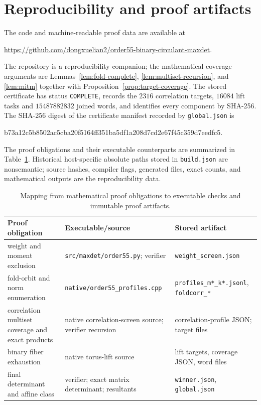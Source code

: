 \documentclass[11pt,a4paper]{article}
\theoremstyle{definition}
\theoremstyle{remark}
\begin{document}
\section{Reproducibility and proof artifacts}
\label{sec:repro}

The code and machine-readable proof data are available at
\begin{center}
\url{https://github.com/dongxuelian2/order55-binary-circulant-maxdet}.
\end{center}
The repository is a reproducibility companion; the mathematical coverage
arguments are Lemmas~\ref{lem:fold-complete}, \ref{lem:multiset-recursion},
and \ref{lem:mitm} together with Proposition~\ref{prop:target-coverage}.
The stored certificate has status \texttt{COMPLETE}, records the $2316$
correlation targets, $16084$ lift tasks and $15487882832$ joined words, and
identifies every component by SHA-256.  The SHA-256 digest of the certificate
manifest recorded by \texttt{global.json} is
\begin{center}
\small\ttfamily
b73a12c5b8502ac5cba20f5164ff351ba5df1a208d7cd2e67f45c359d7eedfc5.
\end{center}

The proof obligations and their executable counterparts are summarized in
Table~\ref{tab:proof-map}.  Historical host-specific absolute paths stored in
\texttt{build.json} are nonsemantic; source hashes, compiler flags, generated
files, exact counts, and mathematical outputs are the reproducibility data.

\begin{table}[ht]
\centering
\small
\begin{tabular}{@{}>{\raggedright\arraybackslash}p{}
                  >{\raggedright\arraybackslash}p{}
                  >{\raggedright\arraybackslash}p{}@{}}
\toprule
Proof obligation & Executable/source & Stored artifact\\
\midrule
weight and moment exclusion
& \texttt{src/maxdet/order55.py}; verifier
& \texttt{weight\_screen.json}\\
fold-orbit and norm enumeration
& \texttt{native/order55\_profiles.cpp}
& \texttt{profiles\_m*\_k*.jsonl}, \texttt{foldcorr\_*}\\
correlation multiset coverage and exact products
& native correlation-screen source; verifier recursion
& correlation-profile JSON; target files\\
binary fiber exhaustion
& native torus-lift source
& lift targets, coverage JSON, word files\\
final determinant and affine class
& verifier; exact matrix determinant; resultants
& \texttt{winner.json}, \texttt{global.json}\\
\bottomrule
\end{tabular}
\caption{Mapping from mathematical proof obligations to executable checks and
immutable proof artifacts.}
\label{tab:proof-map}
\end{table}
\end{document}
